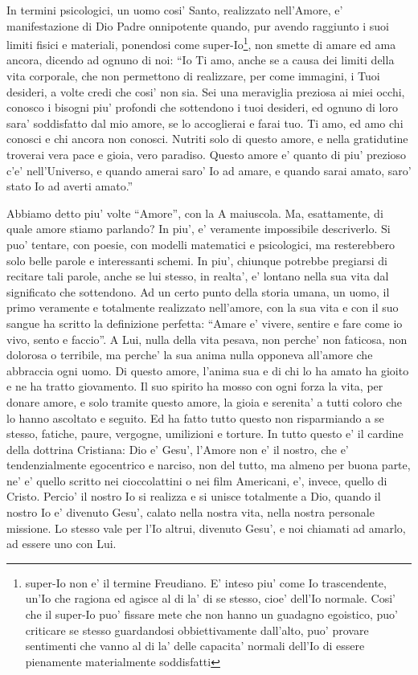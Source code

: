 In termini psicologici, un uomo cosi' Santo, realizzato nell'Amore, e' manifestazione di Dio Padre onnipotente quando, pur avendo raggiunto i suoi limiti fisici e materiali, ponendosi come super-Io\footnote{super-Io non e' il termine Freudiano. E' inteso piu' come Io trascendente, un'Io che ragiona ed agisce al di la' di se stesso, cioe' dell'Io normale. Cosi' che il super-Io puo' fissare mete che non hanno un guadagno egoistico, puo' criticare se stesso guardandosi obbiettivamente dall'alto, puo' provare sentimenti che vanno al di la' delle capacita' normali dell'Io di essere pienamente materialmente soddisfatti}, non smette di amare ed ama ancora, dicendo ad ognuno di noi: 
``Io Ti amo, anche se a causa dei limiti della vita corporale, che non permettono di realizzare, per come immagini, i Tuoi desideri, a volte credi che cosi' non sia. Sei una meraviglia preziosa ai miei occhi, conosco i bisogni piu' profondi che sottendono i tuoi desideri, ed ognuno di loro sara' soddisfatto dal mio amore, se lo accoglierai e farai tuo. Ti amo, ed amo chi conosci e chi ancora non conosci. Nutriti solo di questo amore, e nella gratidutine troverai vera pace e gioia, vero paradiso. Questo amore e' quanto di piu' prezioso c'e' nell'Universo, e quando amerai saro' Io ad amare, e quando sarai amato, saro' stato Io ad averti amato.''

Abbiamo detto piu' volte ``Amore'', con la A maiuscola. Ma, esattamente, di quale amore stiamo parlando? In piu', e' veramente impossibile descriverlo. Si puo' tentare, con poesie, con modelli matematici e psicologici, ma resterebbero solo belle parole e interessanti schemi. In piu', chiunque potrebbe pregiarsi di recitare tali parole, anche se lui stesso, in realta', e' lontano nella sua vita dal significato che sottendono. Ad un certo punto della storia umana, un uomo, il primo veramente e totalmente realizzato nell'amore, con la sua vita e con il suo sangue ha scritto la definizione perfetta: ``Amare e' vivere, sentire e fare come io vivo, sento e faccio''.
A Lui, nulla della vita pesava, non perche' non faticosa, non dolorosa o terribile,
ma perche' la sua anima nulla opponeva all'amore che abbraccia ogni uomo.
Di questo amore, l'anima sua e di chi lo ha amato ha gioito e ne ha tratto giovamento.
Il suo spirito ha mosso con ogni forza la vita, per donare amore, e solo tramite questo amore,
la gioia e serenita' a tutti coloro che lo hanno ascoltato e seguito.
Ed ha fatto tutto questo non risparmiando a se stesso, fatiche, paure, vergogne, umilizioni e torture.
In tutto questo e' il cardine della dottrina Cristiana: Dio e' Gesu', l'Amore non e' il nostro, che e' tendenzialmente egocentrico e narciso, non del tutto, ma almeno per buona parte, ne' e' quello scritto nei cioccolattini o nei film Americani, e', invece, quello di Cristo.
Percio' il nostro Io si realizza e si unisce totalmente a Dio, quando il nostro Io e' divenuto Gesu',
calato nella nostra vita, nella nostra personale missione.
Lo stesso vale per l'Io altrui, divenuto Gesu', e noi chiamati ad amarlo, ad essere uno con Lui.

